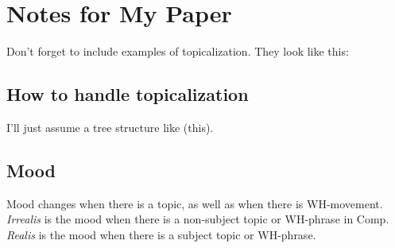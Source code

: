\documentclass[12pt]{article}
\begin{document}
\section*{Notes for My Paper}

Don't forget to include examples of topicalization.
They look like this:

\subsection*{How to handle topicalization}

I'll just assume a tree structure like (this).


\subsection*{Mood}

Mood changes when there is a topic, as well as when
there is WH-movement. \emph{Irrealis} is the mood when
there is a non-subject topic or WH-phrase in Comp.
\emph{Realis} is the mood when there is a subject topic
or WH-phrase.
\end{document}
